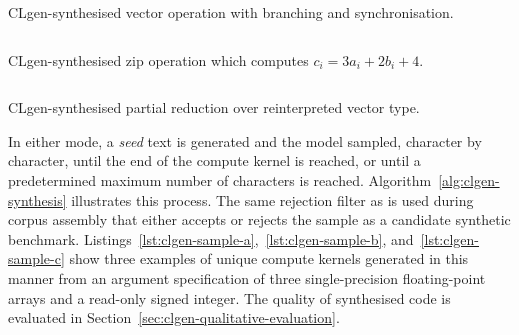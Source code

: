 \begin{listing}
	\inputminted{opencl_lexer.py:OpenCLLexer -x}{lst/clgen-sample-a.cl}
	\caption[Synthesised vector operation with branching and synchronisation]{CLgen-synthesised vector operation with branching and synchronisation.}
	\label{lst:clgen-sample-a}
\end{listing}

\begin{listing}
	\inputminted{opencl_lexer.py:OpenCLLexer -x}{lst/clgen-sample-b.cl}
	\caption[Synthesised zip operation]{CLgen-synthesised zip operation which computes $c_i = 3a_i + 2b_i + 4$.}
	\label{lst:clgen-sample-b}
\end{listing}

\begin{listing}
	\inputminted{opencl_lexer.py:OpenCLLexer -x}{lst/clgen-sample-c.cl}
	\caption[Synthesised partial reduction operation]{CLgen-synthesised partial reduction over reinterpreted vector type.}
	\label{lst:clgen-sample-c}
\end{listing}

In either mode, a \emph{seed} text is generated and the model sampled, character by character, until the end of the compute kernel is reached, or until a predetermined maximum number of characters is reached. Algorithm~\ref{alg:clgen-synthesis} illustrates this process. The same rejection filter as is used during corpus assembly that either accepts or rejects the sample as a candidate synthetic benchmark. Listings~\ref{lst:clgen-sample-a},~\ref{lst:clgen-sample-b}, and~\ref{lst:clgen-sample-c} show three examples of unique compute kernels generated in this manner from an argument specification of three single-precision floating-point arrays and a read-only signed integer. The quality of synthesised code is evaluated in Section~\ref{sec:clgen-qualitative-evaluation}.
